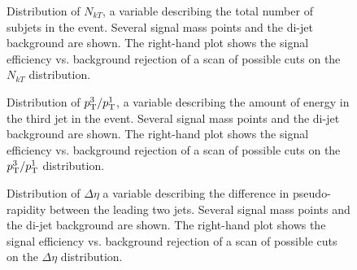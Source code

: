 



\begin{figure}
\centering
{}
\label{fig:search:search:optimization:NKT}
\caption{Distribution of $N_{kT}$, a variable describing the total number of \kt subjets in the event. Several signal mass points and the \herwigpp di-jet background are shown. The right-hand plot shows the signal efficiency vs. background rejection of a scan of possible cuts on the $N_{kT}$ distribution.}
\end{figure}






\begin{figure}
\centering
{}
\label{fig:search:search:optimization:PT31}
\caption{Distribution of $p_{\text{T}}^3/p_{\text{T}}^1$, a variable describing the amount of energy in the third jet in the event. Several signal mass points and the \herwigpp di-jet background are shown. The right-hand plot shows the signal efficiency vs. background rejection of a scan of possible cuts on the $p_{\text{T}}^3/p_{\text{T}}^1$ distribution.}
\end{figure}




\begin{figure}
\centering
{}
\label{fig:search:search:optimization:DEta}
\caption{Distribution of $\Delta \eta$ a variable describing the difference in pseudo-rapidity between the leading two jets. Several signal mass points and the \herwigpp di-jet background are shown. The right-hand plot shows the signal efficiency vs. background rejection of a scan of possible cuts on the $\Delta \eta$ distribution.}
\end{figure}

